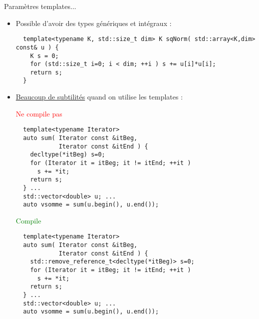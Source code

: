 \documentclass[compress,10pt,aspectratio=169]{beamer}
\begin{document}
  \begin{frame}[fragile]{Paramètres templates...}
  \scriptsize\vspace*{-3mm}
  \begin{block}{\small }
  \begin{itemize}
  \item Possible d'avoir des types génériques et intégraux :
  \begin{verbatim}
  template<typename K, std::size_t dim> K sqNorm( std::array<K,dim> const& u ) {
    K s = 0; 
    for (std::size_t i=0; i < dim; ++i ) s += u[i]*u[i]; 
    return s;
  }
  \end{verbatim}
  \item \underline{\alert{Beaucoup de subtilités}} quand on utilise les templates :
  \vspace*{-3mm}
  \begin{multicols}{2}
  \textcolor{red}{Ne compile pas}
  \begin{verbatim}
  template<typename Iterator> 
  auto sum( Iterator const &itBeg, 
            Iterator const &itEnd ) {
    decltype(*itBeg) s=0;
    for (Iterator it = itBeg; it != itEnd; ++it ) 
      s += *it;
    return s;
  } ...
  std::vector<double> u; ...
  auto vsomme = sum(u.begin(), u.end()); 
  \end{verbatim}
  \columnbreak
  \textcolor{green}{Compile}
  \begin{verbatim}
  template<typename Iterator> 
  auto sum( Iterator const &itBeg, 
            Iterator const &itEnd ) {
    std::remove_reference_t<decltype(*itBeg)> s=0;
    for (Iterator it = itBeg; it != itEnd; ++it ) 
      s += *it;
    return s;
  } ...
  std::vector<double> u; ...
  auto vsomme = sum(u.begin(), u.end());
  \end{verbatim}
  \end{multicols}
    \end{itemize}
    \end{block}
  \end{frame}
   
\end{document}
